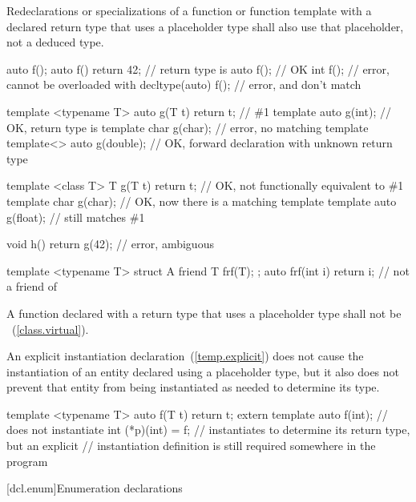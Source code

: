 \pnum
Redeclarations or specializations of a function or function template with a
declared return type that uses a placeholder type shall also use that
placeholder, not a deduced type.
\enterexample
\begin{codeblock}
auto f();
auto f() { return 42; } // return type is 
auto f();               // OK
int f();                // error, cannot be overloaded with 
decltype(auto) f();     // error,  and  don't match

template <typename T> auto g(T t) { return t; } // \#1
template auto g(int);                           // OK, return type is 
template char g(char);                          // error, no matching template
template<> auto g(double);                      // OK, forward declaration with unknown return type

template <class T> T g(T t) { return t; } // OK, not functionally equivalent to \#1
template char g(char);                    // OK, now there is a matching template
template auto g(float);                   // still matches \#1

void h() { return g(42); } // error, ambiguous

template <typename T> struct A {
  friend T frf(T);
};
auto frf(int i) { return i; } // not a friend of 
\end{codeblock}
\exitexample

\pnum
A function declared with a return type that uses a placeholder type shall not
be ~(\ref{class.virtual}).

\pnum
An explicit instantiation declaration~(\ref{temp.explicit}) does not cause the
instantiation of an entity declared using a placeholder type, but it also does
not prevent that entity from being instantiated as needed to determine its
type.
\enterexample
\begin{codeblock}
template <typename T> auto f(T t) { return t; }
extern template auto f(int); // does not instantiate 
int (*p)(int) = f;           // instantiates  to determine its return type, but an explicit
                             // instantiation definition is still required somewhere in the program
\end{codeblock}
\exitexample

[dcl.enum]{Enumeration declarations}%
%
%


